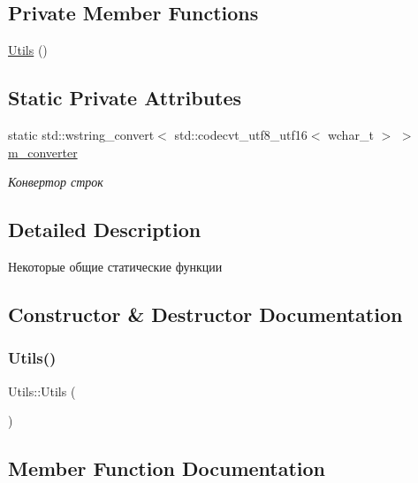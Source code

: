 \subsection*{Private Member Functions}
\begin{DoxyCompactItemize}
\item 
\hyperlink{class_utils_a452e78692c87ed5c7c993b6c6ac4981a}{Utils} ()
\end{DoxyCompactItemize}
\subsection*{Static Private Attributes}
\begin{DoxyCompactItemize}
\item 
static std\+::wstring\+\_\+convert$<$ std\+::codecvt\+\_\+utf8\+\_\+utf16$<$ wchar\+\_\+t $>$ $>$ \hyperlink{class_utils_a8415f00dd3b630399e0f0db336c0efa6}{m\+\_\+converter}
\begin{DoxyCompactList}\small\item\em Конвертор строк \end{DoxyCompactList}\end{DoxyCompactItemize}


\subsection{Detailed Description}
Некоторые общие статические функции 

\subsection{Constructor \& Destructor Documentation}
\mbox{\label{class_utils_a452e78692c87ed5c7c993b6c6ac4981a}} 
\subsubsection{\texorpdfstring{Utils()}{Utils()}}
{\footnotesize\ttfamily Utils\+::\+Utils (\begin{DoxyParamCaption}{ }\end{DoxyParamCaption})\hspace{0.3cm}{\ttfamily [private]}}



\subsection{Member Function Documentation}
\mbox{\label{class_utils_afcee4a224a1de1ff99565163b1650a29}} 
